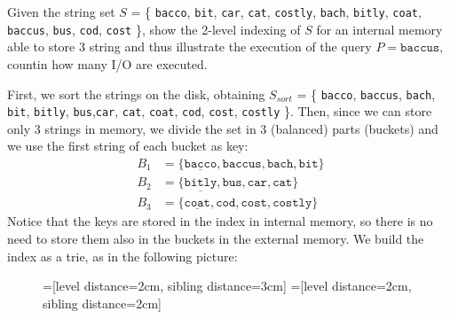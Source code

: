 \exercise

Given the string set $S$ = \{ \texttt{bacco}, \texttt{bit}, \texttt{car},
\texttt{cat}, \texttt{costly}, \texttt{bach}, \texttt{bitly}, \texttt{coat},
\texttt{baccus}, \texttt{bus}, \texttt{cod}, \texttt{cost} \}, show the 2-level
indexing of $S$ for an internal memory able to store 3 string and thus
illustrate the execution of the query $P = \texttt{baccus}$, countin how many
I/O are executed.

\solution

First, we sort the strings on the disk, obtaining $S_{sort}$ = \{
\texttt{bacco}, \texttt{baccus}, \texttt{bach}, \texttt{bit}, \texttt{bitly},
\texttt{bus},\texttt{car}, \texttt{cat}, \texttt{coat}, \texttt{cod},
\texttt{cost}, \texttt{costly} \}. Then, since we can store only 3 strings in
memory, we divide the set in 3 (balanced) parts (buckets) and we use the first
string of each bucket as key:
%
\begin{align*}
  B_1 &= \{ \underline{\texttt{bacco}}, \texttt{baccus}, \texttt{bach},
  \texttt{bit} \} \\
  B_2 &= \{ \underline{\texttt{bitly}}, \texttt{bus},\texttt{car}, \texttt{cat}
  \} \\
  B_3 &= \{ \underline{\texttt{coat}}, \texttt{cod}, \texttt{cost},
  \texttt{costly} \}
\end{align*}
%
Notice that the keys are stored in the index in internal memory, so there is no
need to store them also in the buckets in the external memory. We build the
index as a trie, as in the following picture:
%
\begin{figure}[H]
  \centering
  =[level distance=2cm, sibling distance=3cm]
  =[level distance=2cm, sibling distance=2cm]
\end{figure}
